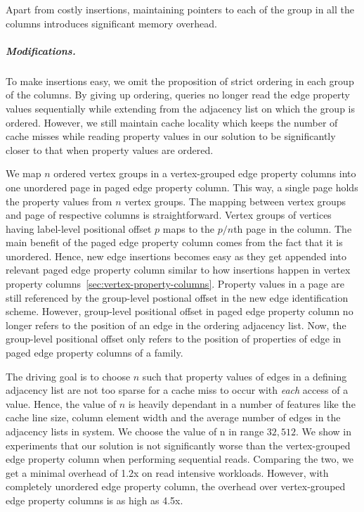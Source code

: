 Apart from costly insertions, maintaining pointers to each of the group in all the columns introduces significant memory overhead. 

\vspace{-16pt}
\subparagraph{Modifications.}
To make insertions easy, we omit the proposition of strict ordering in each group of the columns. By giving up ordering, queries no longer read the edge property values sequentially while extending from the adjacency list on which the group is ordered. However, we still maintain cache locality which keeps the number of cache misses while reading property values in our solution to be significantly closer to that when property values are ordered.

We map $n$ ordered vertex groups in a vertex-grouped edge property columns into one unordered page in paged edge property column. This way, a single page holds the property values from $n$ vertex groups. The mapping between vertex groups and page of respective columns is straightforward. Vertex groups of vertices having label-level positional offset $p$ maps to the $p/n$th page in the column. The main benefit of the paged edge property column comes from the fact that it is unordered. Hence, new edge insertions becomes easy as they get appended into relevant paged edge property column similar to how insertions happen in vertex property columns~\ref{sec:vertex-property-columns}. Property values in a page are still referenced by the group-level postional offset in the new edge identification scheme. However, group-level positional offset in paged edge property column no longer refers to the position of an edge in the ordering adjacency list. Now, the group-level positional offset only refers to the position of properties of edge in paged edge property columns of a family. 

The driving goal is to choose $n$ such that property values of edges in a defining adjacency list are not too sparse for a cache miss to occur with \emph{each} access of a value. Hence, the value of $n$ is heavily dependant in a number of features like the cache line size, column element width and the average number of edges in the adjacency lists in system. We choose the value of n in range $32, 512$. We show in experiments that our solution is not significantly worse than the vertex-grouped edge property column when performing sequential reads. Comparing the two, we get a minimal overhead of 1.2x on read intensive workloads. However, with completely unordered edge property column, the overhead over vertex-grouped edge property columns is as high as 4.5x.


